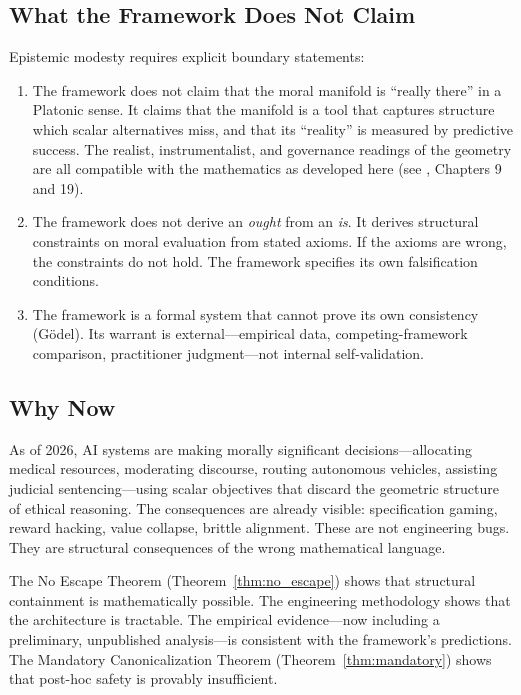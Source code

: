\documentclass[12pt]{article}
\theoremstyle{definition}
\theoremstyle{remark}
\begin{document}
\subsection{What the Framework Does Not Claim}

Epistemic modesty requires explicit boundary statements:

\begin{enumerate}
    \item The framework does not claim that the moral manifold is ``really there'' in a Platonic sense. It claims that the manifold is a tool that captures structure which scalar alternatives miss, and that its ``reality'' is measured by predictive success. The realist, instrumentalist, and governance readings of the geometry are all compatible with the mathematics as developed here (see \citealt{anon2026a}, Chapters 9 and 19).
    \item The framework does not derive an \emph{ought} from an \emph{is}. It derives structural constraints on moral evaluation from stated axioms. If the axioms are wrong, the constraints do not hold. The framework specifies its own falsification conditions.
    \item The framework is a formal system that cannot prove its own consistency (G\"{o}del). Its warrant is external---empirical data, competing-framework comparison, practitioner judgment---not internal self-validation.
\end{enumerate}

\subsection{Why Now}

As of 2026, AI systems are making morally significant decisions---allocating medical resources, moderating discourse, routing autonomous vehicles, assisting judicial sentencing---using scalar objectives that discard the geometric structure of ethical reasoning. The consequences are already visible: specification gaming, reward hacking, value collapse, brittle alignment. These are not engineering bugs. They are structural consequences of the wrong mathematical language.

The No Escape Theorem (Theorem~\ref{thm:no_escape}) shows that structural containment is mathematically possible. The engineering methodology shows that the architecture is tractable. The empirical evidence---now including a preliminary, unpublished analysis---is consistent with the framework's predictions. The Mandatory Canonicalization Theorem (Theorem~\ref{thm:mandatory}) shows that post-hoc safety is provably insufficient.
\end{document}
